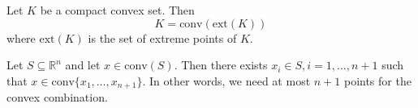 \begin{theorem}
    Let $K$ be a compact convex set. Then 
    $$K = \text{conv}(\text{ext}(K))$$ where $\text{ext}(K)$ is the set of extreme points of $K$.
\end{theorem}
\begin{theorem}
    Let $S \subseteq \mathbb R^n$ and let $x \in \text{conv}(S)$. Then there exists $x_i \in S, i = 1,\ldots, n+1$ such that $x \in \text{conv}\{x_1,\ldots,x_{n+1}\}$. In other words, we need at most $n + 1$ points for the convex combination.
\end{theorem}



